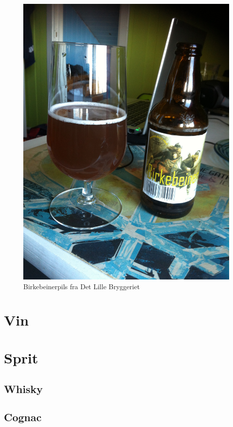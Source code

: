 \documentclass[12pt,a4paper,oneside,norsk]{article}
\begin{document}
\begin{figure} [H]
\centering
\includegraphics[scale=0.1, angle=270]{Bilder/Ol/Birkebeiner.jpg}
\caption{Birkebeinerpils fra Det Lille Bryggeriet}
\end{figure}

\newpage
\section{Vin}

\newpage
\section{Sprit}
\subsection{Whisky}

\newpage
\subsection{Cognac}
\end{document}
